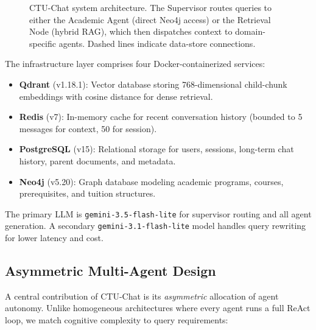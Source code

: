 \documentclass[runningheads]{llncs}
\begin{document}
\begin{figure}[t]
\caption{CTU-Chat system architecture. The Supervisor routes queries to either the Academic Agent (direct Neo4j access) or the Retrieval Node (hybrid RAG), which then dispatches context to domain-specific agents. Dashed lines indicate data-store connections.}
\label{fig:architecture}
\end{figure}

The infrastructure layer comprises four Docker-containerized services:
\begin{itemize}
    \item \textbf{Qdrant} (v1.18.1): Vector database storing 768-dimensional child-chunk embeddings with cosine distance for dense retrieval.
    \item \textbf{Redis} (v7): In-memory cache for recent conversation history (bounded to 5 messages for context, 50 for session).
    \item \textbf{PostgreSQL} (v15): Relational storage for users, sessions, long-term chat history, parent documents, and metadata.
    \item \textbf{Neo4j} (v5.20): Graph database modeling academic programs, courses, prerequisites, and tuition structures.
\end{itemize}

The primary LLM is \texttt{gemini-3.5-flash-lite} for supervisor routing and all agent generation. A secondary \texttt{gemini-3.1-flash-lite} model handles query rewriting for lower latency and cost.

\subsection{Asymmetric Multi-Agent Design}
\label{sec:asymmetric}

A central contribution of CTU-Chat is its \emph{asymmetric} allocation of agent autonomy. Unlike homogeneous architectures where every agent runs a full ReAct loop, we match cognitive complexity to query requirements:
\end{document}
